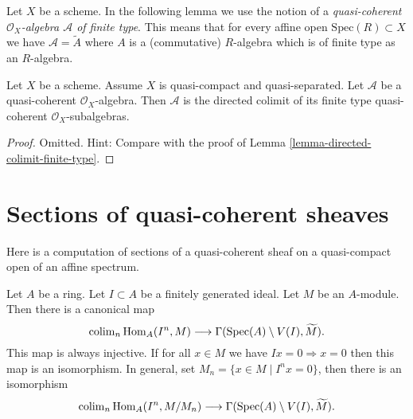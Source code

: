 \noindent
Let $X$ be a scheme. In the following lemma we use the notion
of a {\it quasi-coherent $\mathcal{O}_X$-algebra $\mathcal{A}$
of finite type}. This means that for every affine open
$\text{Spec}(R) \subset X$ we have $\mathcal{A} = \widetilde{A}$
where $A$ is a (commutative) $R$-algebra which is of finite type
as an $R$-algebra.

\begin{lemma}
\label{lemma-algebra-directed-colimit-finite-type}
Let $X$ be a scheme. Assume $X$ is quasi-compact and quasi-separated.
Let $\mathcal{A}$ be a quasi-coherent $\mathcal{O}_X$-algebra.
Then $\mathcal{A}$ is the directed colimit of its finite type
quasi-coherent $\mathcal{O}_X$-subalgebras.
\end{lemma}

\begin{proof}
Omitted. Hint: Compare with the proof of
Lemma \ref{lemma-directed-colimit-finite-type}.
\end{proof}








\section{Sections of quasi-coherent sheaves}
\label{section-sections-quasi-coherent}

\noindent
Here is a computation of sections of a quasi-coherent sheaf on a quasi-compact
open of an affine spectrum.

\begin{lemma}
\label{lemma-sections-over-quasi-compact-open-in-affine}
Let $A$ be a ring.
Let $I \subset A$ be a finitely generated ideal.
Let $M$ be an $A$-module.
Then there is a canonical map
$$
\mathop{\rm colim}\nolimits_n \text{Hom}_A(I^n, M)
\longrightarrow
\Gamma(\text{Spec}(A) \setminus V(I), \widetilde{M}).
$$
This map is always injective.
If for all $x \in M$ we have $Ix = 0 \Rightarrow x = 0$
then this map is an isomorphism. In general, set
$M_n = \{x \in M \mid I^nx = 0\}$, then there is an
isomorphism
$$
\mathop{\rm colim}\nolimits_n \text{Hom}_A(I^n, M/M_n)
\longrightarrow
\Gamma(\text{Spec}(A) \setminus V(I), \widetilde{M}).
$$
\end{lemma}

